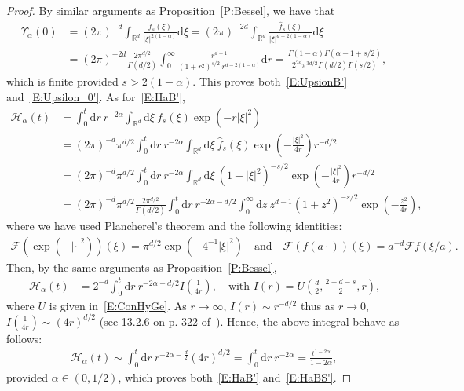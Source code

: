 \documentclass[a4paper,11pt]{article}%
\theoremstyle{plain}
\theoremstyle{definition}
\numberwithin{equation}{section}
\newcommand{\R}{\mathbb{R}}
\newcommand{\ud}{\ensuremath{\mathrm{d}}}
\begin{document}
\begin{proof}
  By similar arguments as Proposition~\ref{P:Bessel}, we have that
	\begin{align*}
     \Upsilon_{\alpha}(0)
     & = (2\pi)^{-d} \int_{\R^d} \frac{f_s(\xi)}{|\xi|^{2(1-\alpha)}} \ud \xi
       = (2\pi)^{-2d} \int_{\R^d} \frac{\widehat{f}_s(\xi)}{|\xi|^{d-2(1-\alpha)}} \ud \xi                                                               \\
     & = (2\pi)^{-2d} \frac{2 \pi^{d/2}}{\Gamma\left(d/2\right)} \int_0^\infty \frac{r^{d-1}}{ \left(1+r^2\right)^{s / 2} \: r^{d - 2(1-\alpha)} } \ud r
       = \frac{\Gamma\left(1 - \alpha\right) \Gamma\left(\alpha - 1 + s/2\right)}{2^{2d} \pi^{3d/2} \Gamma(d/2)\Gamma\left(s/2\right) },
	\end{align*}
  which is finite provided $s>2(1-\alpha)$. This proves both~\eqref{E:UpsionB'}
  and~\eqref{E:Upsilon_0'}. As for~\eqref{E:HaB'},
	\begin{align*}
        \mathcal{H}_\alpha(t)
    & = \int_{0}^t \ud r \: r^{-2\alpha} \int_{\R^d} \ud \xi \: f_{s}(\xi) \exp\left(-r|\xi|^2\right)                                                    \\
    & = (2\pi)^{-d} \pi^{d/2} \int_{0}^t \ud r \: r^{-2\alpha} \int_{\R^d} \ud \xi \: \widehat{f}_{s}(\xi) \exp\left(-\frac{|\xi|^2}{4r}\right) r^{-d/2} \\
    & = (2\pi)^{-d} \pi^{d/2} \int_{0}^t \ud r \: r^{-2\alpha} \int_{\R^d} \ud \xi \: (1 + |\xi|^2)^{-s / 2} \exp\left(-\frac{|\xi|^2}{4r}\right) r^{-d/2}\\
    & = (2\pi)^{-d} \pi^{d/2} \frac{2 \pi^{d/2}}{\Gamma\left(d/2\right)} \int_{0}^t \ud r \: r^{-2\alpha - d/2} \int_0^{\infty} \ud z \: z^{d-1} (1 + z^2)^{-s/2} \exp\left(-\frac{z^2}{4r}\right),
\end{align*}
  where we have used Plancherel's theorem and the following identities:
	\begin{align*}
    \mathcal{F}\left(\exp(-|\cdot|^2)\right)(\xi) = \pi^{d/2} \exp\left(-4^{-1}|\xi|^2\right) \quad \text{and} \quad
    \mathcal{F}(f(a\cdot))(\xi) = a^{-d}\mathcal{F}f(\xi / a).
	\end{align*}
  Then, by the same arguments as Proposition~\ref{P:Bessel},
	\begin{align*}
        \mathcal{H}_\alpha(t)
     & = 2^{-d} \int_{0}^t \ud r \: r^{-2\alpha - d/2} I\left(\frac{1}{4r}\right),
      \quad \text{with $I(r) = U\left(\frac{d}{2}, \frac{2+d-s}{2}, r\right)$,}
	\end{align*}
  where $U$ is given in~\eqref{E:ConHyGe}. As $r \to \infty$, $I(r) \sim r^{-d/2}$ thus as $r \to
  0$, $I\left(\frac{1}{4r}\right) \sim (4r)^{d/2}$ (see 13.2.6 on p. 322
  of~\cite{olver.lozier.ea:10:nist}). Hence, the above integral behave as follows:
	\begin{align*}
     \mathcal{H}_\alpha(t)
     \sim \int_{0}^t \ud r \: r^{-2\alpha - \frac{d}{2}} (4r)^{d/2}
     = \int_{0}^t \ud r \: r^{-2\alpha}
     = \frac{t^{1-2\alpha}}{1-2\alpha},
	\end{align*}
  provided $\alpha \in (0, 1/2)$, which proves both~\eqref{E:HaB'} and~\eqref{E:HaBS'}.
\end{proof}
\end{document}

